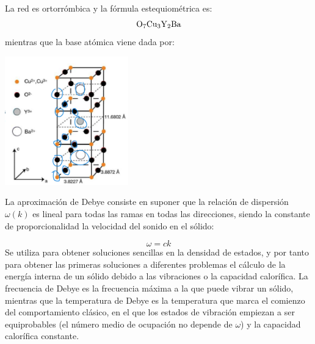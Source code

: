 \begin{solucion}
	La red es ortorrómbica y la fórmula estequiométrica es: 
	\begin{equation*}
		\ce{O_7Cu_3Y_2Ba}
	\end{equation*}
	mientras que la base atómica viene dada por:	
	\begin{center}
		\includegraphics[width=0.4\textwidth]{Imagenes/Enero_2021_01_1.png}
	\end{center}	
\end{solucion}

\begin{solucion}
	La aproximación de Debye consiste en suponer que la relación de dispersión $\omega(k)$ es lineal para todas las ramas en todas las direcciones, siendo la constante de proporcionalidad la velocidad del sonido en el sólido:
	
	\begin{equation*}
		\omega = ck 
	\end{equation*}	
	Se utiliza para obtener soluciones sencillas en la densidad de estados, y por tanto para obtener las primeras soluciones a diferentes problemas el cálculo de la energía interna de un sólido debido a las vibraciones o la capacidad calorífica. La frecuencia de Debye es la frecuencia máxima a la que puede vibrar un sólido, mientras que la temperatura de Debye es la temperatura que marca el comienzo del comportamiento clásico, en el que los estados de vibración empiezan a ser equiprobables (el número medio de ocupación no depende de $\omega$) y la capacidad calorífica constante.
\end{solucion}



